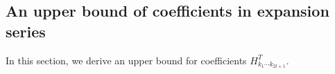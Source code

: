






\subsection{An upper bound of coefficients in expansion series}\label{sec.uppcoef} In this section, we derive an upper bound for coefficients $H^T_{k_1\cdots k_{2l+1}}$.

